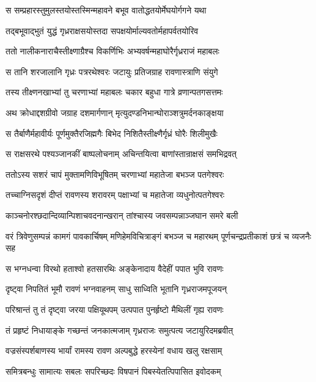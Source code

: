 \twolineshloka
{स सम्प्रहारस्तुमुलस्तयोस्तस्मिन्महावने}
{बभूव वातोद्धतयोर्मेघयोर्गगने यथा} %

\twolineshloka
{तद्बभूवाद्भुतं युद्धं गृध्रराक्षसयोस्तदा}
{सपक्षयोर्माल्यवतोर्महापर्वतयोरिव} %

\twolineshloka
{ततो नालीकनाराचैस्तीक्ष्णाग्रैश्च विकर्णिभिः}
{अभ्यवर्षन्महाघोरैर्गृध्रराजं महाबलः} %

\twolineshloka
{स तानि शरजालानि गृध्रः पत्ररथेश्वरः}
{जटायुः प्रतिजग्राह रावणास्त्राणि संयुगे} %

\twolineshloka
{तस्य तीक्ष्णनखाभ्यां तु चरणाभ्यां महाबलः}
{चकार बहुधा गात्रे व्रणान्पतगसत्तमः} %

\twolineshloka
{अथ क्रोधाद्दशग्रीवो जग्राह दशमार्गणान्}
{मृत्युदण्डनिभान्घोराञ्शत्रुमर्दनकाङ्क्षया} %

\twolineshloka
{स तैर्बाणैर्महावीर्यः पूर्णमुक्तैरजिह्मगैः}
{बिभेद निशितैस्तीक्ष्णैर्गृध्रं घोरैः शिलीमुखैः} %

\twolineshloka
{स राक्षसरथे पश्यञ्जानकीं बाष्पलोचनाम्}
{अचिन्तयित्वा बाणांस्तान्राक्षसं समभिद्रवत्} %

\twolineshloka
{ततोऽस्य सशरं चापं मुक्तामणिविभूषितम्}
{चरणाभ्यां महातेजा बभञ्ज पतगेश्वरः} %

\twolineshloka
{तच्चाग्निसदृशं दीप्तं रावणस्य शरावरम्}
{पक्षाभ्यां च महातेजा व्यधुनोत्पतगेश्वरः} %

\twolineshloka
{काञ्चनोरश्छदान्दिव्यान्पिशाचवदनान्खरान्}
{तांश्चास्य जवसम्पन्नाञ्जघान समरे बली} %

\threelineshloka
{वरं त्रिवेणुसम्पन्नं कामगं पावकार्चिषम्}
{मणिहेमविचित्राङ्गं बभञ्ज च महारथम्}
{पूर्णचन्द्रप्रतीकाशं छत्रं च व्यजनैः सह} %

\twolineshloka
{स भग्नधन्वा विरथो हताश्वो हतसारथिः}
{अङ्केनादाय वैदेहीं पपात भुवि रावणः} %

\twolineshloka
{दृष्ट्वा निपतितं भूमौ रावणं भग्नवाहनम्}
{साधु साध्विति भूतानि गृध्रराजमपूजयन्} %

\twolineshloka
{परिश्रान्तं तु तं दृष्ट्वा जरया पक्षियूथपम्}
{उत्पपात पुनर्हृष्टो मैथिलीं गृह्य रावणः} %

\twolineshloka
{तं प्रहृष्टं निधायाङ्के गच्छन्तं जनकात्मजाम्}
{गृध्रराजः समुत्पत्य जटायुरिदमब्रवीत्} %

\twolineshloka
{वज्रसंस्पर्शबाणस्य भार्यां रामस्य रावण}
{अल्पबुद्धे हरस्येनां वधाय खलु रक्षसाम्} %

\twolineshloka
{समित्रबन्धुः सामात्यः सबलः सपरिच्छदः}
{विषपानं पिबस्येतत्पिपासित इवोदकम्} %

